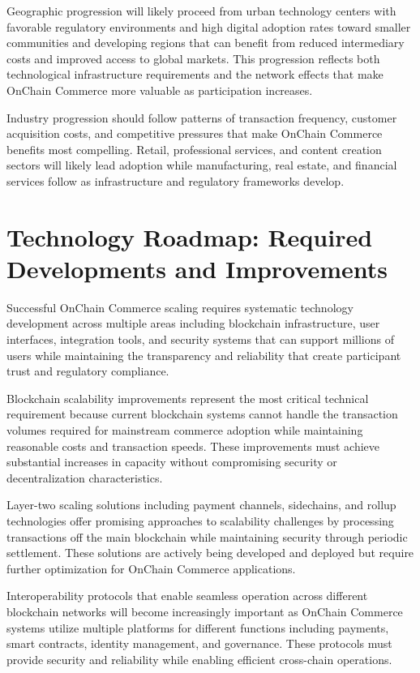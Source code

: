 \documentclass[
  Letterpaper,
]{scrbook}
\begin{document}
Geographic progression will likely proceed from urban technology centers
with favorable regulatory environments and high digital adoption rates
toward smaller communities and developing regions that can benefit from
reduced intermediary costs and improved access to global markets. This
progression reflects both technological infrastructure requirements and
the network effects that make OnChain Commerce more valuable as
participation increases.

Industry progression should follow patterns of transaction frequency,
customer acquisition costs, and competitive pressures that make OnChain
Commerce benefits most compelling. Retail, professional services, and
content creation sectors will likely lead adoption while manufacturing,
real estate, and financial services follow as infrastructure and
regulatory frameworks develop.

\section{Technology Roadmap: Required Developments and
Improvements}\label{technology-roadmap-required-developments-and-improvements}

Successful OnChain Commerce scaling requires systematic technology
development across multiple areas including blockchain infrastructure,
user interfaces, integration tools, and security systems that can
support millions of users while maintaining the transparency and
reliability that create participant trust and regulatory compliance.

Blockchain scalability improvements represent the most critical
technical requirement because current blockchain systems cannot handle
the transaction volumes required for mainstream commerce adoption while
maintaining reasonable costs and transaction speeds. These improvements
must achieve substantial increases in capacity without compromising
security or decentralization characteristics.

Layer-two scaling solutions including payment channels, sidechains, and
rollup technologies offer promising approaches to scalability challenges
by processing transactions off the main blockchain while maintaining
security through periodic settlement. These solutions are actively being
developed and deployed but require further optimization for OnChain
Commerce applications.

Interoperability protocols that enable seamless operation across
different blockchain networks will become increasingly important as
OnChain Commerce systems utilize multiple platforms for different
functions including payments, smart contracts, identity management, and
governance. These protocols must provide security and reliability while
enabling efficient cross-chain operations.
\end{document}
